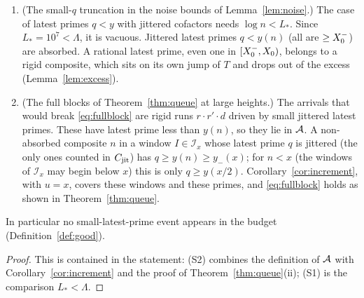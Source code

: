 \begin{proposition}\label{prop:S1S2}
\begin{enumerate}[label=\textup{(S\arabic*)}]
\item (The small-$q$ truncation in the noise bounds of Lemma~\ref{lem:noise}.) The case of latest primes $q<y$ with jittered
  cofactors needs $\log n<L_*$. Since $L_*=10^7<\Lambda$, it is vacuous. Jittered latest primes $q<y(n)$ (all are $\ge X_0^{-}$)
  are absorbed. A rational latest prime, even one in $[X_0^{-},X_0)$, belongs to a rigid composite, which sits on its own jump of
  $T$ and drops out of the excess (Lemma~\ref{lem:excess}).
\item (The full blocks of Theorem~\ref{thm:queue} at large heights.) The arrivals that would break \eqref{eq:fullblock} are rigid runs
  $r\cdot r'\cdot d$ driven by small jittered latest primes. These have latest prime less than $y(n)$, so they lie in $\mathcal{A}$.
  A non-absorbed composite $n$ in a window $I\in\mathcal I_x$ whose latest prime $q$ is jittered (the only ones counted in
  $C_{\mathrm{jit}}$) has $q\ge y(n)\ge y_-(x)$; for $n<x$ (the windows of
  $\mathcal I_x$ may begin below $x$) this is only $q\ge y(x/2)$. Corollary~\ref{cor:increment}, with $u=x$, covers these
  windows and these primes, and \eqref{eq:fullblock} holds as shown in Theorem~\ref{thm:queue}.
\end{enumerate}
In particular no small-latest-prime event appears in the budget (Definition~\ref{def:good}).
\end{proposition}

\begin{proof}
This is contained in the statement: (S2) combines the definition of $\mathcal{A}$ with Corollary~\ref{cor:increment} and the proof of
Theorem~\ref{thm:queue}(ii); (S1) is the comparison $L_*<\Lambda$.
\end{proof}


